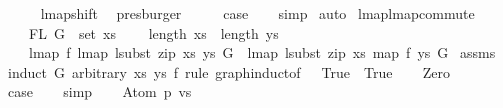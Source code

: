 \begin{isabellebody}
\ \ \ \ \isamarkupfalse%
\ lmap{\isacharunderscore}{\kern0pt}shift{}\ \isamarkupfalse%
\ presburger\isanewline
\ \ \isamarkupfalse%
\ \isamarkupfalse%
\ {\isacharquery}{\kern0pt}case\isanewline
\ \ \isamarkupfalse%
\ simp\isanewline
{}\isamarkupfalse%
\ auto%
\endisatagproof
{\isafoldproof}%
%
\isadelimproof
\isanewline
%
\endisadelimproof
\isanewline
\isanewline
{}\isamarkupfalse%
\ lmap{\isacharunderscore}{\kern0pt}lmap{\isacharunderscore}{\kern0pt}commute{\isacharcolon}{\kern0pt}\isanewline
\ \ \ \ {\isachardoublequoteopen}FL\ G\ {\isasymsubseteq}\ set\ xs{\isachardoublequoteclose}\isanewline
\ \ \ \ {\isachardoublequoteopen}length\ xs\ {\isacharequal}{\kern0pt}\ length\ ys{\isachardoublequoteclose}\isanewline
\ \ \ \ {\isachardoublequoteopen}lmap\ f\ {\isacharparenleft}{\kern0pt}lmap\ {\isacharparenleft}{\kern0pt}lsubst\ {\isacharparenleft}{\kern0pt}zip\ xs\ ys{\isacharparenright}{\kern0pt}{\isacharparenright}{\kern0pt}\ G{\isacharparenright}{\kern0pt}\ {\isacharequal}{\kern0pt}\ lmap\ {\isacharparenleft}{\kern0pt}lsubst\ {\isacharparenleft}{\kern0pt}zip\ xs\ {\isacharparenleft}{\kern0pt}map\ f\ ys{\isacharparenright}{\kern0pt}{\isacharparenright}{\kern0pt}{\isacharparenright}{\kern0pt}\ G{\isachardoublequoteclose}\isanewline
%
\isadelimproof
%
\endisadelimproof
%
\isatagproof
{}\isamarkupfalse%
\ assms\isanewline
{}\isamarkupfalse%
\ {\isacharparenleft}{\kern0pt}induct\ G\ arbitrary{\isacharcolon}{\kern0pt}\ xs\ ys\ f\ rule{\isacharcolon}{\kern0pt}\ graph{\isachardot}{\kern0pt}induct{\isacharbrackleft}{\kern0pt}of\ {\isacharunderscore}{\kern0pt}\ {\isachardoublequoteopen}{\isacharpercent}{\kern0pt}{\isacharunderscore}{\kern0pt}{\isachardot}{\kern0pt}\ True{\isachardoublequoteclose}\ {\isachardoublequoteopen}{\isacharpercent}{\kern0pt}{\isacharunderscore}{\kern0pt}{\isachardot}{\kern0pt}\ True{\isachardoublequoteclose}{\isacharbrackright}{\kern0pt}{\isacharparenright}{\kern0pt}\isanewline
\ \ \isamarkupfalse%
\ Zero\isanewline
\ \ \isamarkupfalse%
\ \isamarkupfalse%
\ {\isacharquery}{\kern0pt}case\isanewline
\ \ \isamarkupfalse%
\ simp\isanewline
{}\isamarkupfalse%
\isanewline
\ \ \isamarkupfalse%
\ {\isacharparenleft}{\kern0pt}Atom\ p\ vs{\isacharparenright}{\kern0pt}\isanewline

\end{isabellebody}
